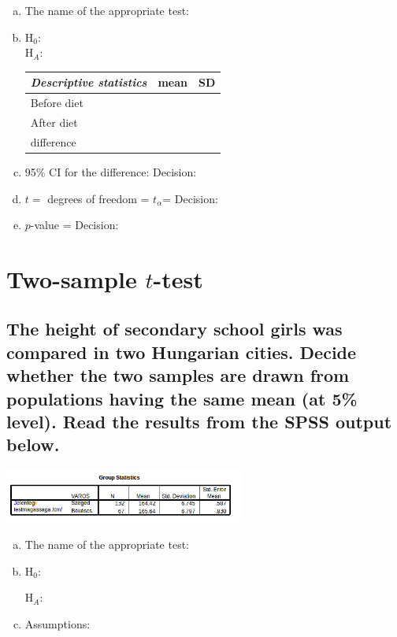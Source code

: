 		
\begin{enumerate}[a)]
\item The name of the appropriate test:	 \hrulefill
\item H$_0$:	 \hrulefill\\
		 H$_A$:	 \hrulefill



		\begin{center}\small
		\begin{tabular}{lC{2cm}C{2cm}}
			\toprule	
				\textit{Descriptive statistics}		& mean & SD\\
			\midrule
			Before diet &&\\
			After diet &&\\
			difference &&\\
			\bottomrule
		\end{tabular}\medskip
	\end{center}
\item 95\% CI for the difference:  \hrulefill
	\quad		Decision: 	\hrulefill
\item $t =$ 	 \hrulefill\quad degrees of freedom = 	 \hrulefill\quad $t_\alpha$=	\hrulefill	
	\quad	 Decision: 	\hrulefill
\item $p$-value = \hrulefill 
	\quad	Decision: \hrulefill

\end{enumerate}


\section{Two-sample $t$-test}
\subsection{The height of secondary school girls was compared in two Hungarian cities. Decide whether the two samples are drawn from populations having the same mean (at 5\% level). Read the results from the SPSS output below.}

	\begin{center}
	\includegraphics[width=0.6\textwidth]{SPSS/Ketmintas1}
	\end{center}

	\begin{enumerate}[a)]
	\item The name of the appropriate test:	\hrulefill
	\item H$_0$:	\hrulefill

		 H$_A$:	\hrulefill
	\item Assumptions:	\hrulefill
	\end{enumerate}
	
